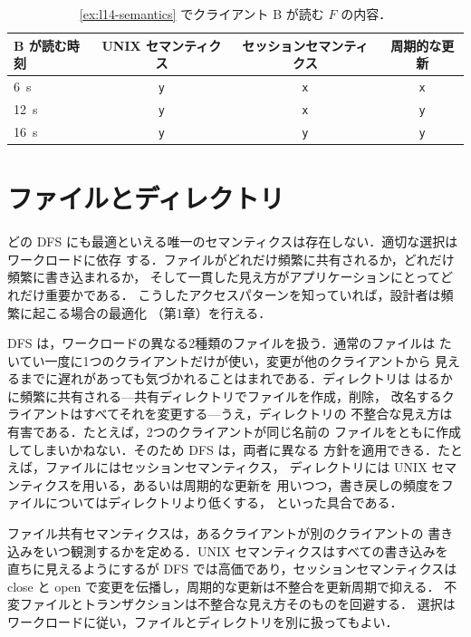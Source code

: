 \documentclass[../main.tex]{subfiles}
\begin{document}
\begin{table}[htbp]
  \centering
  \caption{\cref{ex:l14-semantics} でクライアント B が読む $F$ の内容．}
  \label{tab:l14-semantics}
  \small
  \begin{tabular}{@{}lccc@{}}
    \toprule
    B が読む時刻 & UNIX セマンティクス & セッションセマンティクス &
      周期的な更新 \\
    \midrule
    \SI{6}{\second}  & \texttt{y} & \texttt{x} & \texttt{x} \\
    \SI{12}{\second} & \texttt{y} & \texttt{x} & \texttt{y} \\
    \SI{16}{\second} & \texttt{y} & \texttt{y} & \texttt{y} \\
    \bottomrule
  \end{tabular}
\end{table}

\section{ファイルとディレクトリ}
\label{sec:l14-dirs}

どの DFS にも最適といえる唯一のセマンティクスは存在しない．適切な選択はワークロードに依存
する．ファイルがどれだけ頻繁に共有されるか，どれだけ頻繁に書き込まれるか，
そして一貫した見え方がアプリケーションにとってどれだけ重要かである．
こうしたアクセスパターンを知っていれば，設計者は頻繁に起こる場合の最適化
（第1章）を行える．

DFS は，ワークロードの異なる2種類のファイルを扱う．通常のファイルは
たいてい一度に1つのクライアントだけが使い，変更が他のクライアントから
見えるまでに遅れがあっても気づかれることはまれである．ディレクトリは
はるかに頻繁に共有される---共有ディレクトリでファイルを作成，削除，
改名するクライアントはすべてそれを変更する---うえ，ディレクトリの
不整合な見え方は有害である．たとえば，2つのクライアントが同じ名前の
ファイルをともに作成してしまいかねない．そのため DFS は，両者に異なる
方針を適用できる．たとえば，ファイルにはセッションセマンティクス，
ディレクトリには UNIX セマンティクスを用いる，あるいは周期的な更新を
用いつつ，書き戻しの頻度をファイルについてはディレクトリより低くする，
といった具合である．

\begin{keypoint}
  ファイル共有セマンティクスは，あるクライアントが別のクライアントの
  書き込みをいつ観測するかを定める．UNIX セマンティクスはすべての書き込みを
  直ちに見えるようにするが DFS では高価であり，セッションセマンティクスは
  close と open で変更を伝播し，周期的な更新は不整合を更新周期で抑える．
  不変ファイルとトランザクションは不整合な見え方そのものを回避する．
  選択はワークロードに従い，ファイルとディレクトリを別に扱ってもよい．
\end{keypoint}
\end{document}
